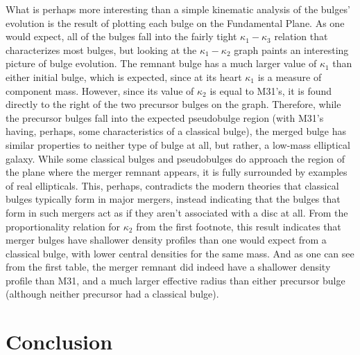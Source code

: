 \documentclass[iop]{emulateapj}
\begin{document}
What is perhaps more interesting than a simple kinematic analysis of the bulges' evolution is the result of plotting each bulge on the Fundamental Plane. As one would expect, all of the bulges fall into the fairly tight $\kappa_1 - \kappa_3$ relation that characterizes most bulges, but looking at the $\kappa_1 - \kappa_2$ graph paints an interesting picture of bulge evolution. The remnant bulge has a much larger value of $\kappa_1$ than either initial bulge, which is expected, since at its heart $\kappa_1$ is a measure of component mass. However, since its value of $\kappa_2$ is equal to M31's, it is found directly to the right of the two precursor bulges on the graph. Therefore, while the precursor bulges fall into the expected pseudobulge region (with M31's having, perhaps, some characteristics of a classical bulge), the merged bulge has similar properties to neither type of bulge at all, but rather, a low-mass elliptical galaxy. While some classical bulges and pseudobulges do approach the region of the plane where the merger remnant appears, it is fully surrounded by examples of real ellipticals. This, perhaps, contradicts the modern theories that classical bulges typically form in major mergers, instead indicating that the bulges that form in such mergers act as if they aren't associated with a disc at all. From the proportionality relation for $\kappa_2$ from the first footnote, this result indicates that merger bulges have shallower density profiles than one would expect from a classical bulge, with lower central densities for the same mass. And as one can see from the first table, the merger remnant did indeed have a shallower density profile than M31, and a much larger effective radius than either precursor bulge (although neither precursor had a classical bulge).

\section{Conclusion}
\end{document}
